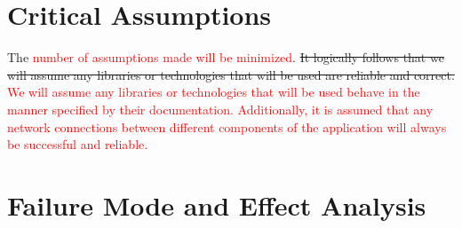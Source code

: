 \documentclass{article}
\begin{document}
\section{Critical Assumptions}

The \textcolor{red}{number of assumptions made will be minimized}. \sout{It logically follows that we will assume any libraries or technologies that will be used are reliable and correct.} \textcolor{red}{We will assume any libraries or technologies that will be used behave in the manner specified by their documentation. Additionally, it is assumed that any network connections between different components of the application will always be successful and reliable.}

\section{Failure Mode and Effect Analysis}
\end{document}
